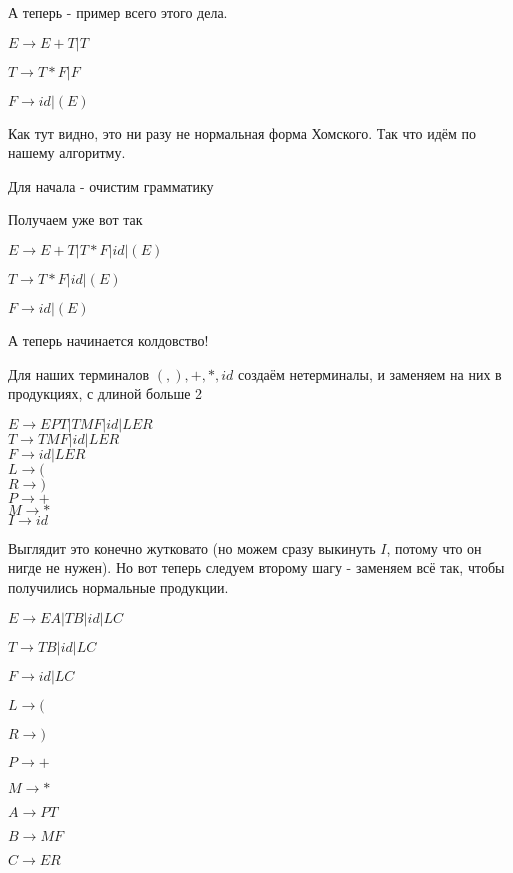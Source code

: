 \documentclass{article}
\begin{document}
А теперь - пример всего этого дела.
\begin{center}
$ E \to E+T | T $

$ T \to  T*F | F $

$ F \to id | (E) $
\end{center}


Как тут видно, это ни разу не нормальная форма Хомского. Так что идём по нашему алгоритму. 

Для начала - очистим грамматику

Получаем уже вот так
\begin{center}
$ E \to E+T | T*F | id | (E) $

$ T \to  T*F | id | (E) $

$ F \to id | (E) $
\end{center}

А теперь начинается колдовство!

Для наших терминалов $ (,),+,*,id $ создаём нетерминалы, и заменяем на них в продукциях, с длиной больше 2

\begin{center}
$ E \to EPT | TMF | id | LER $\\
$ T \to  TMF | id | LER $\\
$ F \to id | LER $\\
$ L \to ( $\\
$ R \to ) $\\
$ P \to + $\\
$ M \to * $\\
$ I \to id $\\
\end{center}

Выглядит это конечно жутковато (но можем сразу выкинуть $I$, потому что он нигде не нужен). 
Но вот теперь следуем второму шагу - заменяем всё так, чтобы получились нормальные продукции.

\begin{center}
$ E \to EA | TB | id | LC $

$ T \to  TB | id | LC $

$ F \to id | LC $

$ L \to ( $

$ R \to ) $

$ P \to + $

$ M \to * $

$ A \to PT $

$ B \to MF $

$ C \to ER $
\end{center}
\end{document}
